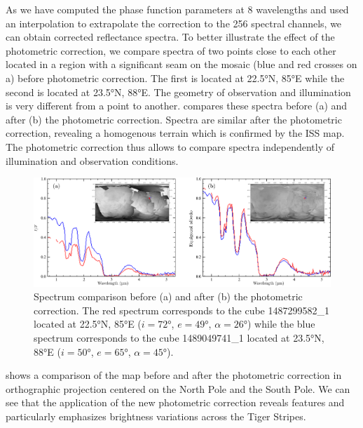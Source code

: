 \documentclass{arxiv-icarus}
\begin{document}
As we have computed the phase function parameters at 8 wavelengths and used an interpolation to extrapolate the correction to the 256 spectral channels, we can obtain corrected reflectance spectra. To better illustrate the effect of the photometric correction, we compare spectra of two points close to each other located in a region with a significant seam on the mosaic (blue and red crosses on a) before photometric correction. The first is located at \ang{22.5}N, \ang{85}E while the second is located at \ang{23.5}N, \ang{88}E. The geometry of observation and illumination is very different from a point to another.  compares these spectra before (a) and after (b) the photometric correction. Spectra are similar after the photometric correction, revealing a homogenous terrain which is confirmed by the ISS map. The photometric correction thus allows to compare spectra independently of illumination and observation conditions.

\begin{figure}[!ht]
    \vspace{.25cm}
    \includegraphics[width=.84\linewidth]{Fig_8}
    \caption{Spectrum comparison before (a) and after (b) the photometric correction. The red spectrum corresponds to the cube 1487299582\_1 located at \ang{22.5}N, \ang{85}E ($i = \ang{72}$, $e = \ang{49}$, $\alpha = \ang{26}$) while the blue spectrum corresponds to the cube 1489049741\_1 located at \ang{23.5}N, \ang{88}E ($i = \ang{50}$, $e = \ang{65}$, $\alpha = \ang{45}$).}
    \label{fig:fig_8}
\end{figure}

 shows a comparison of the map before and after the photometric correction in orthographic projection centered on the North Pole and the South Pole. We can see that the application of the new photometric correction reveals features and particularly emphasizes brightness variations across the Tiger Stripes.
\end{document}
